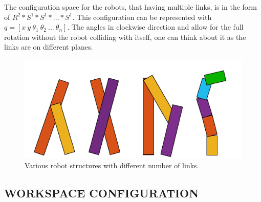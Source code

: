 \documentclass{IEEEtaes}
\newcommand{\algrule}[1][.1pt]{\par\vskip.2\baselineskip\hrule height #1\par\vskip.5\baselineskip}
\begin{document}
The configuration space for the robots, that having multiple links, is in the form of $R^2*S^1*S^1*...*S^1$. This configuration can be represented with $q = [ x \ y \ \theta_1 \ \theta_2 \ ... \ \theta_n ]$. The angles in clockwise direction and allow for the full rotation without the robot colliding with itself, one can think about it as the links are on different planes.



\begin{figure}[b]
    \vspace{-2em}
    \begin{center}
        \includegraphics[width=0.85\linewidth]{figures/TOPOLOGIES.pdf}
     \end{center}
     \caption{Various robot structures with different number of links.}
     \label{topologies}
\end{figure}

\subsection{{\fontsize{11}{10}\selectfont W}ORKSPACE CONFIGURATION}
\end{document}
